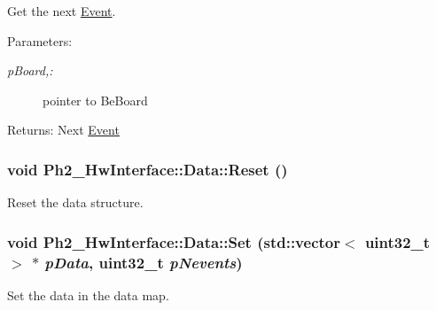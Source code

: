 Get the next \hyperlink{class_ph2___hw_interface_1_1_event}{Event}. 

\begin{Desc}
\item[Parameters:]
\begin{description}
\item[{\em p\-Board,:}]pointer to Be\-Board \end{description}
\end{Desc}
\begin{Desc}
\item[Returns:]Next \hyperlink{class_ph2___hw_interface_1_1_event}{Event} \end{Desc}
\hypertarget{class_ph2___hw_interface_1_1_data_b33619d62d7662d11cf6c2bddebcc835}{
\subsubsection[Reset]{\setlength{\rightskip}{0pt plus 5cm}void Ph2\_\-Hw\-Interface::Data::Reset ()}}
\label{class_ph2___hw_interface_1_1_data_b33619d62d7662d11cf6c2bddebcc835}


Reset the data structure. 

\hypertarget{class_ph2___hw_interface_1_1_data_fc701768a1f0920c07fc238c6cab185c}{
\subsubsection[Set]{\setlength{\rightskip}{0pt plus 5cm}void Ph2\_\-Hw\-Interface::Data::Set (std::vector$<$ uint32\_\-t $>$ $\ast$ {\em p\-Data}, uint32\_\-t {\em p\-Nevents})}}
\label{class_ph2___hw_interface_1_1_data_fc701768a1f0920c07fc238c6cab185c}


Set the data in the data map. 

